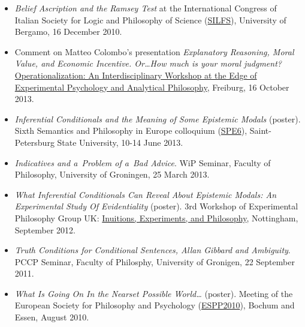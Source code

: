 \documentclass[a4paper,12pt]{article}
\begin{document}
\begin{small}
\begin{itemize}
    
  \item \emph{Belief Ascription and the Ramsey Test} at the
    International Congress of Italian Society for Logic and Philosophy
    of Science
    (\href{http://dinamico2.unibg.it/silfs/convegno2010.htm}{SILFS}),
    University of Bergamo, 16 December
    2010. %
  \end{itemize}
  

  \begin{itemize}

\item Comment on Matteo Colombo's presentation \emph{Explanatory Reasoning, Moral Value, and Economic Incentive. Or\ldots How much is your moral judgment?} 
    \href{http://www.psychologie.uni-freiburg.de/Members/singmann/operational2013}{Operationalization: An Interdisciplinary Workshop at the Edge of Experimental Psychology and Analytical Philosophy}, Freiburg, 16 October 2013.

  \item \emph{Inferential Conditionals and the Meaning of Some
      Epistemic Modals} (poster). Sixth Semantics and Philosophy
    in Europe colloquium
    (\href{http://spe6conference.wordpress.com}{SPE6}),
    Saint-Petersburg State University, 10-14 June 2013.
    
  \item \emph{Indicatives and a~Problem of a~Bad Advice}. WiP
    Seminar, Faculty of Philosophy, University of Groningen, 25 March
    2013.
    
  \item \emph{What Inferential Conditionals Can Reveal About Epistemic
      Modals: An Experimental Study Of Evidentiality} (poster).
    3rd Workshop of Experimental Philosophy Group UK:
    \href{https://www.nottingham.ac.uk/philosophy/research/conferences/workshop-intuitions-experimentsandphilosophy.aspx}{Inuitions,
      Experiments, and Philosophy}, Nottingham, September 2012.

  \item \emph{Truth Conditions for Conditional Sentences, Allan
      Gibbard and Ambiguity}. PCCP Seminar, Faculty of
    Philosphy, University of Gronigen, 22 September 2011.
    
  \item \emph{What Is Going On In the Nearset Possible World\ldots} (poster). 
  Meeting of the European Society for Philosophy and  Psychology
    (\href{http://www.ruhr-uni-bochum.de/philosophy/espp2010/index.html}{ESPP2010}),
    Bochum and Essen, August 2010.


\end{itemize}
\end{small}
\end{document}
